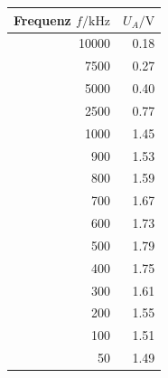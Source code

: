 \documentclass[]{scrartcl}
\begin{document}
\begin{table}[H]
	\centering
	\label{tab:differentiator}
	\hskip-1.50cm
	\begin{tabular}{r r}
		\toprule
		Frequenz $f / \si{\kilo\hertz}$ & $U_A / \si{\volt}$ \\
		\midrule
		10000 & 0.18 \\
		7500  & 0.27 \\
		5000  & 0.40 \\
		2500  & 0.77 \\
		1000  & 1.45 \\
		900   & 1.53 \\
		800   & 1.59 \\
		700   & 1.67 \\
		600   & 1.73 \\
		500   & 1.79 \\
		400   & 1.75 \\
		300   & 1.61 \\
		200   & 1.55 \\
		100   & 1.51 \\
		50    & 1.49 \\
		\bottomrule
	\end{tabular}
\end{table}
\end{document}
